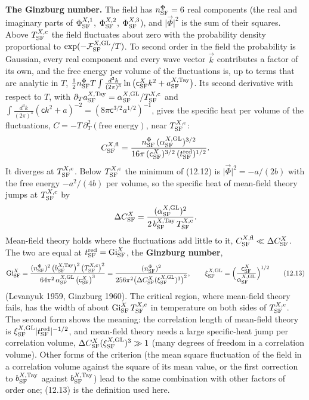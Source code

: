 \documentclass[
  10pt,
]{article}
\begin{document}
\textbf{The Ginzburg number.} The field has \(n^\Phi_{\rm SF}=6\) real
components (the real and imaginary parts of \(\Phi^{X,1}_{\rm SF}\),
\(\Phi^{X,2}_{\rm SF}\), \(\Phi^{X,3}_{\rm SF}\)), and
\(\lvert\vec\Phi\rvert^2\) is the sum of their squares. Above
\(T^{X,{\rm c}}_{\rm SF}\) the field fluctuates about zero with the
probability density proportional to
\(\exp(-\mathcal F^{X,{\rm GL}}_{\rm SF}/T)\). To second order in the
field the probability is Gaussian, every real component and every wave
vector \(\vec k\) contributes a factor of its own, and the free energy
per volume of the fluctuations is, up to terms that are analytic in
\(T\),
\(\tfrac12n^\Phi_{\rm SF}T\int\frac{d^3k}{(2\pi)^3}\ln\big(\mathsf c^X_{\rm SF}k^2+a^{X,{\rm Tay}}_{\rm SF}\big)\).
Its second derivative with respect to \(T\), with
\(\partial_Ta^{X,{\rm Tay}}_{\rm SF}=\alpha^{X,{\rm GL}}_{\rm SF}/T^{X,{\rm c}}_{\rm SF}\)
and
\(\int\frac{d^3k}{(2\pi)^3}(\mathsf ck^2+a)^{-2}=(8\pi\mathsf c^{3/2}a^{1/2})^{-1}\),
gives the specific heat per volume of the fluctuations,
\(C=-T\,\partial^2_T(\text{free energy})\), near
\(T^{X,{\rm c}}_{\rm SF}\):
\[C^{X,{\rm fl}}_{\rm SF}=\frac{n^\Phi_{\rm SF}\,(\alpha^{X,{\rm GL}}_{\rm SF})^{3/2}}{16\pi\,(\mathsf c^X_{\rm SF})^{3/2}\,(t^{\rm red}_{\rm SF})^{1/2}}.\]
It diverges at \(T^{X,{\rm c}}_{\rm SF}\). Below
\(T^{X,{\rm c}}_{\rm SF}\) the minimum of (12.12) is
\(\lvert\vec\Phi\rvert^2=-a/(2b)\) with the free energy \(-a^2/(4b)\)
per volume, so the specific heat of mean-field theory jumps at
\(T^{X,{\rm c}}_{\rm SF}\) by
\[\Delta C^X_{\rm SF}=\frac{(\alpha^{X,{\rm GL}}_{\rm SF})^2}{2\,b^{X,{\rm Tay}}_{\rm SF}\,T^{X,{\rm c}}_{\rm SF}}.\]
Mean-field theory holds where the fluctuations add little to it,
\(C^{X,{\rm fl}}_{\rm SF}\ll\Delta C^X_{\rm SF}\). The two are equal at
\(t^{\rm red}_{\rm SF}={\rm Gi}^{X}_{\rm SF}\), the \textbf{Ginzburg
number},
\[{\rm Gi}^{X}_{\rm SF}=\frac{(n^\Phi_{\rm SF})^2\,\big(b^{X,{\rm Tay}}_{\rm SF}\big)^2\,\big(T^{X,{\rm c}}_{\rm SF}\big)^2}{64\pi^2\,\alpha^{X,{\rm GL}}_{\rm SF}\,\big(\mathsf c^X_{\rm SF}\big)^3}=\frac{(n^\Phi_{\rm SF})^2}{256\pi^2\big(\Delta C^X_{\rm SF}(\xi^{X,{\rm GL}}_{\rm SF})^3\big)^2},\qquad\xi^{X,{\rm GL}}_{\rm SF}=\Big(\frac{\mathsf c^X_{\rm SF}}{\alpha^{X,{\rm GL}}_{\rm SF}}\Big)^{1/2}\tag{12.13}\]
(Levanyuk 1959, Ginzburg 1960). The critical region, where mean-field
theory fails, has the width of about
\({\rm Gi}^{X}_{\rm SF}\,T^{X,{\rm c}}_{\rm SF}\) in temperature on both
sides of \(T^{X,{\rm c}}_{\rm SF}\). The second form shows the meaning:
the correlation length of mean-field theory is
\(\xi^{X,{\rm GL}}_{\rm SF}\lvert t^{\rm red}_{\rm SF}\rvert^{-1/2}\),
and mean-field theory needs a large specific-heat jump per correlation
volume, \(\Delta C^X_{\rm SF}(\xi^{X,{\rm GL}}_{\rm SF})^3\gg1\) (many
degrees of freedom in a correlation volume). Other forms of the
criterion (the mean square fluctuation of the field in a correlation
volume against the square of its mean value, or the first correction to
\(b^{X,{\rm Tay}}_{\rm SF}\) against \(b^{X,{\rm Tay}}_{\rm SF}\)) lead
to the same combination with other factors of order one; (12.13) is the
definition used here.
\end{document}
